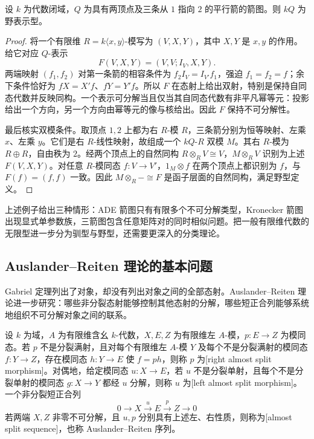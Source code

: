 \begin{proposition}\label{b5:prop:three-kronecker-wild}
	设 \(k\) 为代数闭域，\(Q\) 为具有两顶点及三条从 \(1\) 指向 \(2\) 的平行箭的箭图。则 \(kQ\) 为野表示型。
\end{proposition}
\begin{proof}
	将一个有限维 \(R=k\langle x,y\rangle\)-模写为 \((V,X,Y)\)，其中 \(X,Y\) 是 \(x,y\) 的作用。给它对应 \(Q\)-表示
	\[
		F(V,X,Y)=(V,V;I_V,X,Y).
	\]
	两端映射 \((f_1,f_2)\) 对第一条箭的相容条件为 \(f_2I_V=I_{V'}f_1\)，强迫 \(f_1=f_2=f\)；余下条件恰好为 \(fX=X'f\)、\(fY=Y'f\)。所以 \(F\) 在态射上给出双射，特别是保持自同态代数并反映同构。一个表示可分解当且仅当其自同态代数有非平凡幂等元：投影给出一个方向，另一个方向由幂等元的像与核给出。因此 \(F\) 保持不可分解性。

	最后核实双模条件。取顶点 \(1,2\) 上都为右 \(R\)-模 \(R\)，三条箭分别为恒等映射、左乘 \(x\)、左乘 \(y\)。它们是右 \(R\)-线性映射，故组成一个 \(kQ\)-\(R\) 双模 \(M\)。其右 \(R\)-模为 \(R\oplus R\)，自由秩为 \(2\)。经两个顶点上的自然同构 \(R\otimes_R V\cong V\)，\(M\otimes_R V\) 识别为上述 \(F(V,X,Y)\)。对任意 \(R\)-模同态 \(f:V\to V'\)，\(1_M\otimes f\) 在两个顶点上都识别为 \(f\)，与 \(F(f)=(f,f)\) 一致。因此 \(M\otimes_R-\cong F\) 是函子层面的自然同构，满足野型定义。
\end{proof}

上述例子给出三种情形：ADE 箭图只有有限多个不可分解类型，Kronecker 箭图出现显式单参数族，三箭图包含任意矩阵对的同时相似问题。把一般有限维代数的无限型进一步分为驯型与野型，还需要更深入的分类理论。

\subsection{Auslander--Reiten 理论的基本问题}
\label{b5:subsec:1004:03}

Gabriel 定理列出了对象，却没有列出对象之间的全部态射。Auslander--Reiten 理论进一步研究：哪些非分裂态射能够控制其他态射的分解，哪些短正合列能够系统地组织不可分解对象之间的联系。

\begin{definition}\label{b5:def:almost-split-sequence}
	设 \(k\) 为域，\(A\) 为有限维含幺 \(k\)-代数，\(X,E,Z\) 为有限维左 \(A\)-模，\(p:E\to Z\) 为模同态。若 \(p\) 不是分裂满射，且对每个有限维左 \(A\)-模 \(Y\) 及每个不是分裂满射的模同态 \(f:Y\to Z\)，存在模同态 \(h:Y\to E\) 使 \(f=ph\)，则称 \(p\) 为[right almost split morphism]。对偶地，给定模同态 \(u:X\to E\)，若 \(u\) 不是分裂单射，且每个不是分裂单射的模同态 \(g:X\to Y\) 都经 \(u\) 分解，则称 \(u\) 为[left almost split morphism]。一个非分裂短正合列
	\[
		0\longrightarrow X\xrightarrow{u}E\xrightarrow{p}Z\longrightarrow0
	\]
	若两端 \(X,Z\) 非零不可分解，且 \(u,p\) 分别具有上述左、右性质，则称为[almost split sequence]，也称 Auslander--Reiten 序列。
\end{definition}


